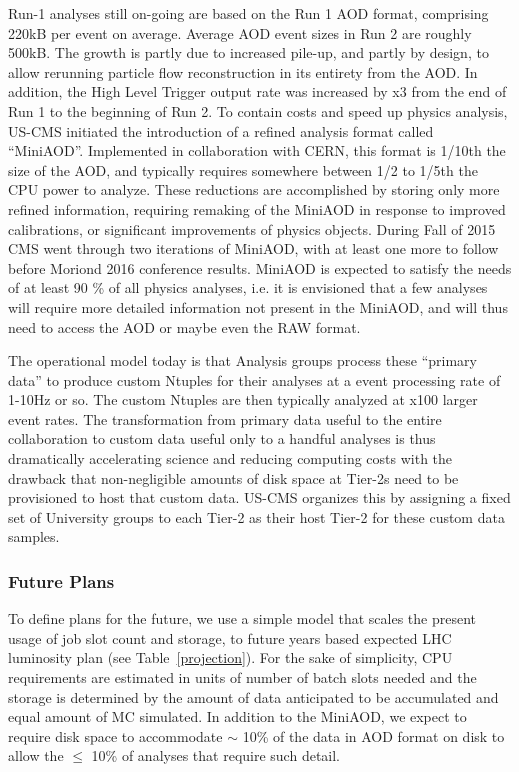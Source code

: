 \documentclass[11pt,a4paper]{article}
\begin{document}
Run-1 analyses still on-going are based on the Run 1 AOD format, comprising 220kB per event on average.
Average AOD event sizes in Run 2 are roughly 500kB. The growth is partly due to increased pile-up, and partly by design,
to allow rerunning particle flow reconstruction in its entirety from the AOD.
In addition, the High Level Trigger output rate was increased by x3 from the end of Run 1 to the beginning of Run 2.
To contain costs and speed up physics analysis, US-CMS initiated the introduction of a 
refined analysis format called ``MiniAOD''.  Implemented in collaboration with CERN, this format is 1/10th the size of the AOD, 
and typically requires somewhere between 1/2 to 1/5th the CPU power to
analyze. These reductions are accomplished by storing only more refined information, 
requiring remaking of the MiniAOD in response to improved calibrations, or significant
improvements of physics objects. During Fall of 2015 CMS went through two iterations
of MiniAOD, with at least one more to follow before Moriond 2016 conference results.
MiniAOD is expected to satisfy the needs of at least 90 \% of all physics analyses, i.e. 
it is envisioned that a few analyses will require more detailed information not present 
in the MiniAOD, and will thus need to access the AOD or maybe even the RAW format.

The operational model today is that Analysis groups process these ``primary data'' to produce custom 
Ntuples for their analyses at a event processing rate of 1-10Hz or so. The custom Ntuples are then typically 
analyzed at x100 larger event rates. The transformation from primary data useful to the entire collaboration to custom data useful
only to a handful analyses is thus dramatically accelerating science and reducing computing costs with the drawback that non-negligible
amounts of disk space at Tier-2s need to be provisioned to host that custom data. US-CMS organizes this by assigning a fixed set of 
University groups to each Tier-2 as their host Tier-2 for these custom data samples.

\subsubsection{Future Plans}


To define plans for the future, we use a simple model that scales
the present usage of job slot count and storage, to future years based
expected LHC  luminosity plan (see Table~\ref{projection}).
For the sake of simplicity, CPU requirements are estimated in units of number of 
batch slots needed and the storage is determined by the amount of
data anticipated to be accumulated and equal amount of MC simulated.
In addition to the MiniAOD, we expect to require disk space to accommodate 
$\sim$ 10\% of the data in AOD format on disk to allow the $\le$ 10\% of 
analyses that require such detail.
\end{document}
